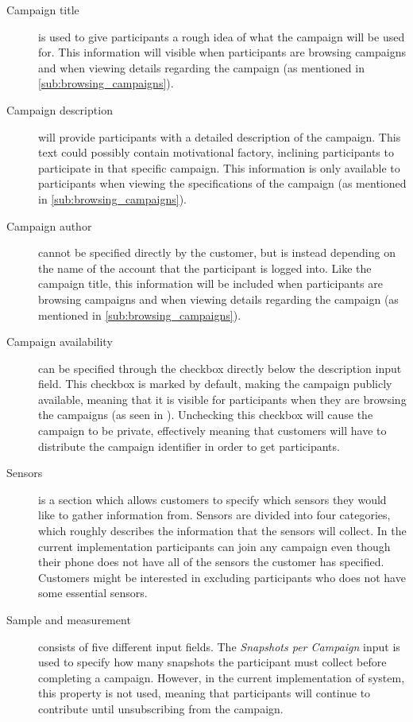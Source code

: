 \begin{description}
    \item[Campaign title] is used to give participants a rough idea of what the campaign will be used for. This information will visible when participants are browsing campaigns and when viewing details regarding the campaign (as mentioned in \ref{sub:browsing_campaigns}).

    \item[Campaign description] will provide participants with a detailed description of the campaign. This text could possibly contain motivational factory, inclining participants to participate in that specific campaign. This information is only available to participants when viewing the specifications of the campaign (as mentioned in \ref{sub:browsing_campaigns}).

    \item[Campaign author] cannot be specified directly by the customer, but is instead depending on the name of the account that the participant is logged into. Like the campaign title, this information will be included when participants are browsing campaigns and when viewing details regarding the campaign (as mentioned in \ref{sub:browsing_campaigns}).

    \item[Campaign availability] can be specified through the checkbox directly below the description input field. This checkbox is marked by default, making the campaign publicly available, meaning that it is visible for participants when they are browsing the campaigns (as seen in ). Unchecking this checkbox will cause the campaign to be private, effectively meaning that customers will have to distribute the campaign identifier in order to get participants.

    \item[Sensors] is a section which allows customers to specify which sensors they would like to gather information from. Sensors are divided into four categories, which roughly describes the information that the sensors will collect. In the current implementation participants can join any campaign even though their phone does not have all of the sensors the customer has specified. Customers might be interested in excluding participants who does not have some essential sensors.

    \item[Sample and measurement] consists of five different input fields. The \emph{Snapshots per Campaign} input is used to specify how many snapshots the participant must collect before completing a campaign. However, in the current implementation of system, this property is not used, meaning that participants will continue to contribute until unsubscribing from the campaign. 


\end{description}
